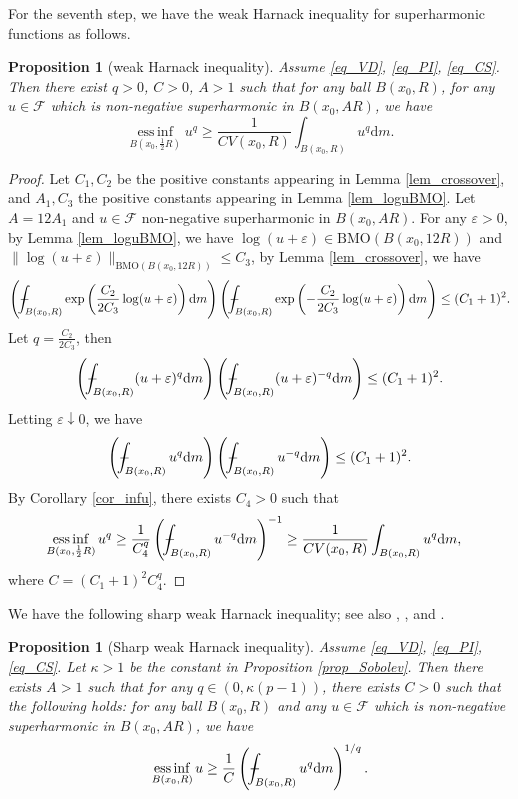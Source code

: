 \documentclass[11pt,a4paper]{article}
\numberwithin{equation}{section}
\newcommand{\einf}{\operatorname*{ess\,inf}}
\def\Xint#1{\mathchoice
{\XXint\displaystyle\textstyle{#1}}%
{\XXint\textstyle\scriptstyle{#1}}%
{\XXint\scriptstyle\scriptscriptstyle{#1}}%
{\XXint\scriptscriptstyle\scriptscriptstyle{#1}}%
\!\int}
\def\XXint#1#2#3{{\setbox0=\hbox{$#1{#2#3}{\int}$ }
\vcenter{\hbox{$#2#3$ }}\kern-.6\wd0}}
\def\dashint{\Xint-}
\theoremstyle{plain}
\newtheorem{proposition}[theorem]{Proposition}
\theoremstyle{definition}
\begin{document}
For the seventh step, we have the weak Harnack inequality for superharmonic functions as follows.

\begin{proposition}[weak Harnack inequality]\label{prop_wEHI}
Assume \ref{eq_VD}, \ref{eq_PI}, \ref{eq_CS}. Then there exist $q>0$, $C>0$, $A>1$ such that for any ball $B(x_0,R)$, for any $u\in\mathcal{F}$ which is non-negative superharmonic in $B(x_0,AR)$, we have
$$\einf_{B(x_0,\frac{1}{2}R)}u^q\ge \frac{1}{CV(x_0,R)}\int_{B(x_0,R)}u^q\mathrm{d} m.$$
\end{proposition}

\begin{proof}
Let $C_1,C_2$ be the positive constants appearing in Lemma \ref{lem_crossover}, and $A_1, C_3$ the positive constants appearing in Lemma \ref{lem_loguBMO}. Let $A=12A_1$ and $u\in\mathcal{F}$ non-negative superharmonic in $B(x_0,AR)$. For any $\varepsilon>0$, by Lemma \ref{lem_loguBMO}, we have $\log(u+\varepsilon)\in \mathrm{BMO}(B(x_0,12R))$ and $\lVert {\log(u+\varepsilon)}\rVert_{\mathrm{BMO}(B(x_0,12R))}\le C_3$, by Lemma \ref{lem_crossover}, we have
$$\left(\dashint_{B(x_0,R)}\exp \left(\frac{C_2}{2C_3}\log (u+\varepsilon)\right)\mathrm{d} m\right)\left(\dashint_{B(x_0,R)}\exp \left(-\frac{C_2}{2C_3}\log (u+\varepsilon)\right)\mathrm{d} m\right)\le(C_1+1)^2.$$
Let $q=\frac{C_2}{2C_3}$, then
$$\left(\dashint_{B(x_0,R)}(u+\varepsilon)^q\mathrm{d} m\right)\left(\dashint_{B(x_0,R)}(u+\varepsilon)^{-q}\mathrm{d} m\right)\le (C_1+1)^2.$$
Letting $\varepsilon\downarrow0$, we have
$$\left(\dashint_{B(x_0,R)}u^q\mathrm{d} m\right)\left(\dashint_{B(x_0,R)}u^{-q}\mathrm{d} m\right)\le(C_1+1)^2.$$
By Corollary \ref{cor_infu}, there exists $C_4>0$ such that
\begin{align*}
&\einf_{B(x_0,\frac{1}{2}R)}u^q\ge \frac{1}{C_4^q}\left(\dashint_{B(x_0,R)}u^{-q}\mathrm{d} m\right)^{-1}\ge \frac{1}{CV(x_0,R)}\int_{B(x_0,R)}u^q\mathrm{d} m,
\end{align*}
where $C=(C_1+1)^2C_4^q$.
\end{proof}

We have the following sharp weak Harnack inequality; see also \cite[Theorem 3.59]{HKM06}, \cite[Theorem 4.3]{KM03}, and \cite[Theorem 8.34]{BB11}.

\begin{proposition}[Sharp weak Harnack inequality]\label{prop_wEHI_sharp}
Assume \ref{eq_VD}, \ref{eq_PI}, \ref{eq_CS}. Let $\kappa>1$ be the constant in Proposition \ref{prop_Sobolev}. Then there exists $A>1$ such that for any $q\in(0,\kappa(p-1))$, there exists $C>0$ such that the following holds: for any ball $B(x_0,R)$ and any $u\in \mathcal{F}$ which is non-negative superharmonic in $B(x_0,AR)$, we have
\begin{equation}\label{eq_wEHI_sharp}
\einf_{B(x_0,R)}u\ge \frac{1}{C}\left(\dashint_{B(x_0,R)}u^q \mathrm{d}m\right)^{1/q}.
\end{equation}
\end{proposition}
\end{document}
